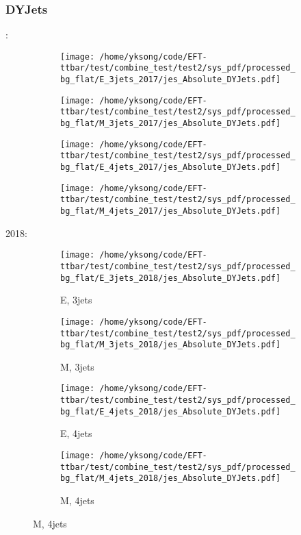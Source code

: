 \documentclass{beamer}
\begin{document}
\begin{frame}
\frametitle{DYJets}
\fontsize{5}{1}:
\begin{figure}
\centering
\begin{subfigure}[b]{0.24\textwidth}
\texttt{[image: /home/yksong/code/EFT-ttbar/test/combine\_test/test2/sys\_pdf/processed\_bg\_flat/E\_3jets\_2017/jes\_Absolute\_DYJets.pdf]}
\end{subfigure}
\begin{subfigure}[b]{0.24\textwidth}
\texttt{[image: /home/yksong/code/EFT-ttbar/test/combine\_test/test2/sys\_pdf/processed\_bg\_flat/M\_3jets\_2017/jes\_Absolute\_DYJets.pdf]}
\end{subfigure}
\begin{subfigure}[b]{0.24\textwidth}
\texttt{[image: /home/yksong/code/EFT-ttbar/test/combine\_test/test2/sys\_pdf/processed\_bg\_flat/E\_4jets\_2017/jes\_Absolute\_DYJets.pdf]}
\end{subfigure}
\begin{subfigure}[b]{0.24\textwidth}
\texttt{[image: /home/yksong/code/EFT-ttbar/test/combine\_test/test2/sys\_pdf/processed\_bg\_flat/M\_4jets\_2017/jes\_Absolute\_DYJets.pdf]}
\end{subfigure}
\end{figure}
2018:
\begin{figure}
\centering
\begin{subfigure}[b]{0.24\textwidth}
\texttt{[image: /home/yksong/code/EFT-ttbar/test/combine\_test/test2/sys\_pdf/processed\_bg\_flat/E\_3jets\_2018/jes\_Absolute\_DYJets.pdf]}
\captionsetup{font=tiny}
\caption{E, 3jets}
\end{subfigure}
\begin{subfigure}[b]{0.24\textwidth}
\texttt{[image: /home/yksong/code/EFT-ttbar/test/combine\_test/test2/sys\_pdf/processed\_bg\_flat/M\_3jets\_2018/jes\_Absolute\_DYJets.pdf]}
\captionsetup{font=tiny}
\caption{M, 3jets}
\end{subfigure}
\begin{subfigure}[b]{0.24\textwidth}
\texttt{[image: /home/yksong/code/EFT-ttbar/test/combine\_test/test2/sys\_pdf/processed\_bg\_flat/E\_4jets\_2018/jes\_Absolute\_DYJets.pdf]}
\captionsetup{font=tiny}
\caption{E, 4jets}
\end{subfigure}
\begin{subfigure}[b]{0.24\textwidth}
\texttt{[image: /home/yksong/code/EFT-ttbar/test/combine\_test/test2/sys\_pdf/processed\_bg\_flat/M\_4jets\_2018/jes\_Absolute\_DYJets.pdf]}
\captionsetup{font=tiny}
\caption{M, 4jets}
\end{subfigure}
\end{figure}
\end{frame}
\end{document}

